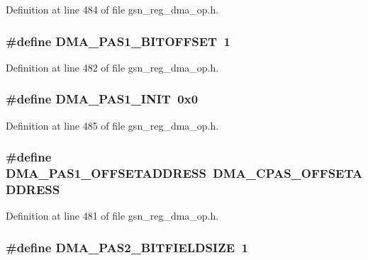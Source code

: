 Definition at line 484 of file gsn\_\-reg\_\-dma\_\-op.h.

\hypertarget{a00547_aa6ae0da6647d82b9b1d74b9761ad0d62}{
\subsubsection[{DMA\_\-PAS1\_\-BITOFFSET}]{\setlength{\rightskip}{0pt plus 5cm}\#define DMA\_\-PAS1\_\-BITOFFSET~1}}
\label{a00547_aa6ae0da6647d82b9b1d74b9761ad0d62}


Definition at line 482 of file gsn\_\-reg\_\-dma\_\-op.h.

\hypertarget{a00547_ab297c98415d9bb6ab9fb929899f1613a}{
\subsubsection[{DMA\_\-PAS1\_\-INIT}]{\setlength{\rightskip}{0pt plus 5cm}\#define DMA\_\-PAS1\_\-INIT~0x0}}
\label{a00547_ab297c98415d9bb6ab9fb929899f1613a}


Definition at line 485 of file gsn\_\-reg\_\-dma\_\-op.h.

\hypertarget{a00547_adfeca7ea4b143ed349bd23de9a0bb9fd}{
\subsubsection[{DMA\_\-PAS1\_\-OFFSETADDRESS}]{\setlength{\rightskip}{0pt plus 5cm}\#define DMA\_\-PAS1\_\-OFFSETADDRESS~DMA\_\-CPAS\_\-OFFSETADDRESS}}
\label{a00547_adfeca7ea4b143ed349bd23de9a0bb9fd}


Definition at line 481 of file gsn\_\-reg\_\-dma\_\-op.h.

\hypertarget{a00547_af5e2335b39cfc91dbc4ee39ba6531804}{
\subsubsection[{DMA\_\-PAS2\_\-BITFIELDSIZE}]{\setlength{\rightskip}{0pt plus 5cm}\#define DMA\_\-PAS2\_\-BITFIELDSIZE~1}}
\label{a00547_af5e2335b39cfc91dbc4ee39ba6531804}


